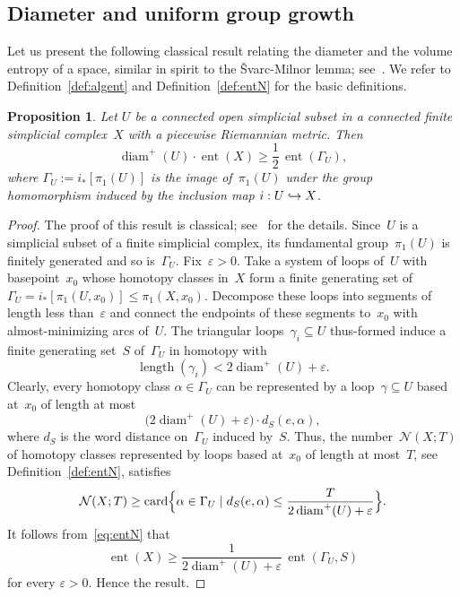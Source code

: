 \documentclass[10pt]{amsart}
\newcommand\hto{\mathrel{\lhook\joinrel\to}}
\DeclareMathOperator{\card}{card}
\newtheorem{proposition}[theorem]{Proposition}
\theoremstyle{definition}
\DeclareMathOperator\diam{diam}
\DeclareMathOperator{\ent}{ent}\let\eent\ent
\DeclareMathOperator{\length}{length}
\begin{document}
\subsection{Diameter and uniform group growth}

Let us present the following classical result relating the diameter and the volume entropy of a space, similar in spirit to the \v{S}varc-Milnor lemma; see~\cite[\S5.16]{gro99}.
We refer to Definition~\ref{def:algent} and Definition~\ref{def:entN} for the basic definitions.

\begin{proposition}\label{prop:diam-ent}
Let $U$ be a connected open simplicial subset in a connected finite simplicial complex~$X$ with a piecewise Riemannian metric.
Then
\[
\diam^+(U) \cdot \ent(X) \geq \frac{1}{2} \, \ent(\Gamma_U),
\]
where $\Gamma_U := i_*[\pi_1(U)]$ is the image of~$\pi_1(U)$ under the group homomorphism induced by the inclusion map $i:U \hto X$.
\end{proposition}

\begin{proof}
The proof of this result is classical; see~\cite[Prop.\,3.22]{gro99} for the details.
Since~$U$ is a simplicial subset of a finite simplicial complex, its fundamental group~$\pi_1(U)$ is finitely generated and so is~$\Gamma_U$.
Fix~$\varepsilon >0$.
Take a system of loops of~$U$ with basepoint~$x_0$ whose homotopy classes in~$X$ form a finite generating set of~$\Gamma_U = i_*[\pi_1(U,x_0)] \leqslant \pi_1(X,x_0)$.
Decompose these loops into segments of length less than~$\varepsilon$ and connect the endpoints of these segments to~$x_0$ with almost-minimizing arcs of~$U$.
The triangular loops~$\gamma_ i \subseteq U$ thus-formed induce a finite generating set~$S$ of~$\Gamma_U$ in homotopy with
\[
\length(\gamma_i) < 2 \diam^+(U) + \varepsilon.
\]
Clearly, every homotopy class $\alpha \in \Gamma_U$ can be represented by a loop~$\gamma \subseteq U$ based at~$x_0$ of length at most
\[
\bigl(2 \diam^+(U) + \varepsilon\bigr) \cdot d_S(e,\alpha),
\]
where $d_S$ is the word distance on~$\Gamma_U$ induced by~$S$.
Thus, the number~$\mathcal{N}(X;T)$ of homotopy classes represented by loops based at~$x_0$ of length at most~$T$, see Definition~\ref{def:entN}, satisfies
\[
\mathcal{N}(X;T) \geq \card \Bigl\{\alpha \in\Gamma_U \mid d_S(e,\alpha) \leq \frac{T}{2 \diam^+(U) + \varepsilon} \Bigr\}.
\]
It follows from~\eqref{eq:entN} that
\[
\eent(X) \geq \frac{1}{2 \diam^+(U) + \varepsilon} \, \ent(\Gamma_U,S)
\]
for every $\varepsilon >0$.
Hence the result.
\end{proof}
\end{document}
